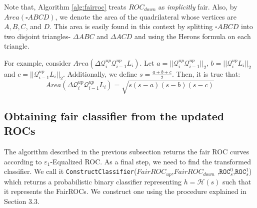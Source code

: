 \documentclass{article}
\newcommand{\sg}[1]{ \textcolor{brown}{{\bf SG: }{``\em #1''}}}
\newcommand{\ourdef}{-Equalized ROC}
\newcommand{\roc}{\texttt{ROC}_s}
\begin{document}
    
Note that, Algorithm \ref{alg:fairroc} treats $ROC_{down}$ as \emph{implicitly} fair.
Also, by $Area(\square ABCD)$, we denote the area of the quadrilateral whose vertices are $A,B,C$, and $D$. This area is easily found in this context by splitting $\square ABCD$ into two disjoint triangles- $\Delta ABC$ and $\Delta ACD$ and using the Herons formula \cite{kendig20002000} on each triangle. 

For example, consider $Area(\Delta \mathcal{Q}_i^{up} \mathcal{Q}_{i-1}^{up} L_i)$. Let $a = ||\mathcal{Q}_i^{up} \mathcal{Q}_{i-1}^{up}||_2$, $b = ||\mathcal{Q}_i^{up} L_i||_2$ and $c = ||\mathcal{Q}_{i-1}^{up} L_i||_2$. Additionally, we define $s = \frac{a+b+c}{2}$. Then, it is true that:
\[Area(\Delta \mathcal{Q}_i^{up} \mathcal{Q}_{i-1}^{up} L_i ) = \sqrt{s(s-a)(s-b)(s-c)}\]



\subsection{Obtaining fair classifier from the updated ROCs} \label{ssec:randomclass}

The algorithm described in the previous subsection returns the fair ROC curves according to $\varepsilon_1$\ourdef. As a final step, we 
need to find the transformed classifier.  We call it \texttt{ConstructClassifier}($FairROC_{up}$,$FairROC_{down}$
,$\roc^0$,$\roc^1$) which returns a probabilistic binary classifier representing $h = \mathcal{H}(s)$ such that it represents the FairROCs. We construct one using the procedure explained in Section 3.3.
\end{document}

